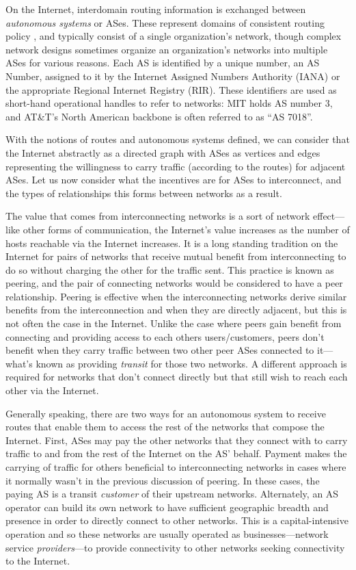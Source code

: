 On the Internet, interdomain routing information is exchanged between
\emph{autonomous systems} or ASes. These represent domains of consistent
routing policy \cite{rfc1930}, and typically consist of a single organization's
network, though complex network designs sometimes organize an organization's
networks into multiple ASes for various reasons. Each AS is identified by a
unique number, an AS Number, assigned to it by the Internet Assigned Numbers
Authority (IANA) or the appropriate Regional Internet Registry (RIR). These
identifiers are used as short-hand operational handles to refer to networks:
MIT holds AS number 3, and AT\&T's North American backbone is often referred to
as ``AS 7018''.

With the notions of routes and autonomous systems defined, we can consider that
the Internet abstractly as a directed graph with ASes as vertices and edges
representing the willingness to carry traffic (according to the routes) for
adjacent ASes. Let us now consider what the incentives are for ASes to
interconnect, and the types of relationships this forms between networks as a
result.

The value that comes from interconnecting networks is a sort of network
effect---like other forms of communication, the Internet's value increases as
the number of hosts reachable via the Internet increases. It is a long standing
tradition on the Internet for pairs of networks that receive mutual benefit
from interconnecting to do so without charging the other for the traffic sent.
This practice is known as peering, and the pair of connecting networks would be
considered to have a peer relationship. Peering is effective when the
interconnecting networks derive similar benefits from the interconnection and
when they are directly adjacent, but this is not often the case in the
Internet. Unlike the case where peers gain benefit from connecting and
providing access to each others users/customers, peers don't benefit when they
carry traffic between two other peer ASes connected to it---what's known as
providing \emph{transit} for those two networks. A different approach is
required for networks that don't connect directly but that still wish to reach
each other via the Internet.

Generally speaking, there are two ways for an autonomous system to receive
routes that enable them to access the rest of the networks that compose the
Internet. First, ASes may pay the other networks that they connect with to
carry traffic to and from the rest of the Internet on the AS' behalf. Payment
makes the carrying of traffic for others beneficial to interconnecting networks
in cases where it normally wasn't in the previous discussion of peering. In
these cases, the paying AS is a transit \emph{customer} of their upstream
networks. Alternately, an AS operator can build its own network to have
sufficient geographic breadth and presence in order to directly connect to
other networks. This is a capital-intensive operation and so these networks are
usually operated as businesses---network service \emph{providers}---to provide
connectivity to other networks seeking connectivity to the Internet.

